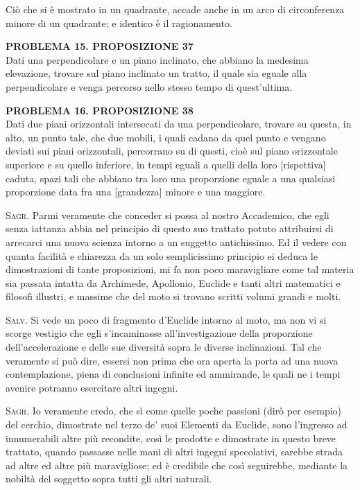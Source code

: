 \documentclass[11pt,twoside,openany]{book}
\newcommand{\speaker}[1]{\textcolor{rubric}{\textsc{#1}}\space}
\begin{document}
Ciò che si è mostrato in un quadrante, accade anche in un arco di circonferenza minore di un quadrante; e identico è il ragionamento.

\textbf{PROBLEMA 15. PROPOSIZIONE 37}\\ Dati una perpendicolare e un piano inclinato, che abbiano la medesima elevazione, trovare sul piano inclinato un tratto, il quale sia eguale alla perpendicolare e venga percorso nello stesso tempo di quest'ultima.

\textbf{PROBLEMA 16. PROPOSIZIONE 38}\\ Dati due piani orizzontali intersecati da una perpendicolare, trovare su questa, in alto, un punto tale, che due mobili, i quali cadano da quel punto e vengano deviati sui piani orizzontali, percorrano su di questi, cioè sul piano orizzontale superiore e su quello inferiore, in tempi eguali a quelli della loro [rispettiva] caduta, spazi tali che abbiano tra loro una proporzione eguale a una qualsiasi proporzione data fra una [grandezza] minore e una maggiore.

\speaker{Sagr.} Parmi veramente che conceder si possa al nostro Accademico, che egli senza iattanza abbia nel principio di questo suo trattato potuto attribuirsi di arrecarci una nuova scienza intorno a un suggetto antichissimo. Ed il vedere con quanta facilità e chiarezza da un solo semplicissimo principio ei deduca le dimostrazioni di tante proposizioni, mi fa non poco maravigliare come tal materia sia passata intatta da Archimede, Apollonio, Euclide e tanti altri matematici e filosofi illustri, e massime che del moto si trovano scritti volumi grandi e molti.

\speaker{Salv.} Si vede un poco di fragmento d'Euclide intorno al moto, ma non vi si scorge vestigio che egli s'incaminasse all'investigazione della proporzione dell'accelerazione e delle sue diversità sopra le diverse inclinazioni. Tal che veramente si può dire, essersi non prima che ora aperta la porta ad una nuova contemplazione, piena di conclusioni infinite ed ammirande, le quali ne i tempi avenire potranno esercitare altri ingegni.

\speaker{Sagr.} Io veramente credo, che sì come quelle poche passioni (dirò per esempio) del cerchio, dimostrate nel terzo de' suoi Elementi da Euclide, sono l'ingresso ad innumerabili altre più recondite, così le prodotte e dimostrate in questo breve trattato, quando passasse nelle mani di altri ingegni specolativi, sarebbe strada ad altre ed altre più maravigliose; ed è credibile che così seguirebbe, mediante la nobiltà del soggetto sopra tutti gli altri naturali.
\end{document}
